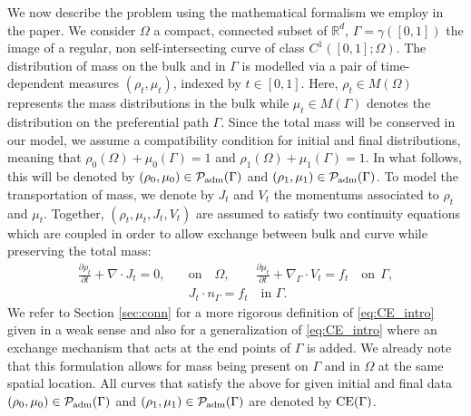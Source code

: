 \documentclass{article}
\def\R{{\mathbb R}}
\begin{document}
We now describe the problem using the mathematical formalism we employ in the paper. We consider $\Omega$ a compact, connected subset of $\R^d$, $\Gamma = \gamma([0,1])$ the image of a regular, non self-intersecting curve of class $C^1([0,1];\Omega)$. The distribution of mass on the bulk and in $\Gamma$ is modelled via a pair of time-dependent measures $(\rho_t,\mu_t)$, indexed by $t\in [0, 1]$. Here, $\rho_t \in M(\Omega)$ represents the mass distributions in the  bulk while $\mu_t \in M(\Gamma)$ denotes the distribution on the preferential path $\Gamma$. 
Since the total mass will be conserved in our model, we assume a compatibility condition for initial and final distributions, meaning that $\rho_0(\Omega) + \mu_0(\Gamma) = 1$ and $\rho_1(\Omega) + \mu_1(\Gamma) = 1$. In what follows, this will be denoted by $(\rho_0, \mu_0) \in \mathcal{P}_{\rm adm}(\Gamma)$ and $(\rho_1, \mu_1) \in \mathcal{P}_{\rm adm}(\Gamma)$.
To model the transportation of mass, we denote by $J_t$ and $V_t$ the momentums associated to $\rho_t$ and $\mu_t$. Together, $(\rho_t,\mu_t, J_t, V_t)$ are assumed to satisfy two continuity equations which are coupled in order to allow exchange between bulk and curve while preserving the total mass:
\begin{align}\label{eq:CE_intro}
    \frac{\partial \rho_t}{\partial t}+\nabla \cdot J_t=0, \quad &\text{on} \quad \Omega, \qquad \frac{\partial \mu_t}{\partial t}+ \nabla_\Gamma \cdot V_t=f_t\quad \text{on} \ \  \Gamma, \\
    & J_t \cdot n_{\Gamma} = f_t \quad \text{in } \Gamma \nonumber.
\end{align}
We refer to Section \ref{sec:conn} for a more rigorous definition of \eqref{eq:CE_intro} given in a weak sense and also for a generalization of \eqref{eq:CE_intro} where 
 an exchange mechanism that acts at the end points of $\Gamma$ is added. We already note that this formulation allows for mass being present on $\Gamma$ and in $\Omega$ at the same spatial location. All curves that satisfy the above for given initial and final data $(\rho_0,\mu_0) \in \mathcal{P}_{\rm adm}(\Gamma)$ and $(\rho_1,\mu_1) \in \mathcal{P}_{\rm adm}(\Gamma)$ are denoted by ${\rm CE}(\Gamma)$.
\end{document}
